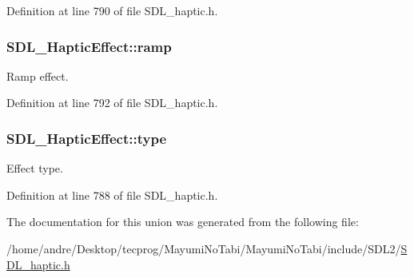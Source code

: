 Definition at line 790 of file S\-D\-L\-\_\-haptic.\-h.

\hypertarget{union_s_d_l___haptic_effect_a1d32ef4c2d1cc89dc938b392f6ad81bd}{
\subsubsection[{ramp}]{ S\-D\-L\-\_\-\-Haptic\-Effect\-::ramp}}\label{union_s_d_l___haptic_effect_a1d32ef4c2d1cc89dc938b392f6ad81bd}
Ramp effect. 

Definition at line 792 of file S\-D\-L\-\_\-haptic.\-h.

\hypertarget{union_s_d_l___haptic_effect_a5ff6cfd8da91537091e9a6c2108cb179}{
\subsubsection[{type}]{ S\-D\-L\-\_\-\-Haptic\-Effect\-::type}}\label{union_s_d_l___haptic_effect_a5ff6cfd8da91537091e9a6c2108cb179}
Effect type. 

Definition at line 788 of file S\-D\-L\-\_\-haptic.\-h.



The documentation for this union was generated from the following file\-:\begin{DoxyCompactItemize}
\item 
/home/andre/\-Desktop/tecprog/\-Mayumi\-No\-Tabi/\-Mayumi\-No\-Tabi/include/\-S\-D\-L2/\hyperlink{_s_d_l__haptic_8h}{S\-D\-L\-\_\-haptic.\-h}\end{DoxyCompactItemize}
